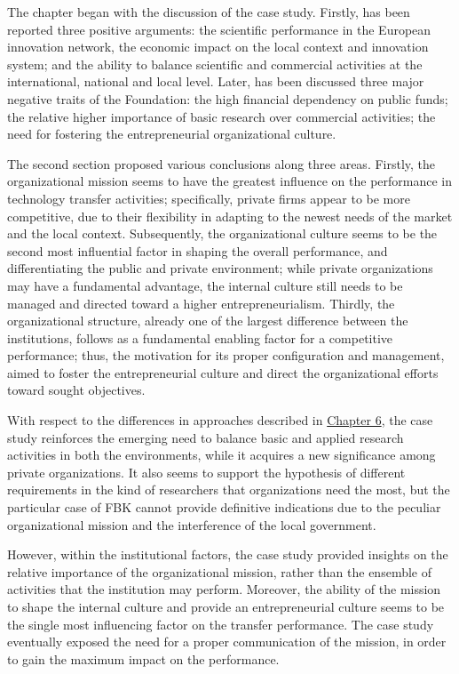 The chapter began with the discussion of the case study. Firstly, has been reported three positive arguments: the scientific performance in the European innovation network, the economic impact on the local context and innovation system; and the ability to balance scientific and commercial activities at the international, national and local level. Later, has been discussed three major negative traits of the Foundation: the high financial dependency on public funds; the relative higher importance of basic research over commercial activities; the need for fostering the entrepreneurial organizational culture. 

The second section proposed various conclusions along three areas. Firstly, the organizational mission seems to have the greatest influence on the performance in technology transfer activities; specifically, private firms appear to be more competitive, due to their flexibility in adapting to the newest needs of the market and the local context. Subsequently, the organizational culture seems to be the second most influential factor in shaping the overall performance, and differentiating the public and private environment; while private organizations may have a fundamental advantage, the internal culture still needs to be managed and directed toward a higher entrepreneurialism. Thirdly, the organizational structure, already one of the largest difference between the institutions, follows as a fundamental enabling factor for a competitive performance; thus, the motivation for its proper configuration and management, aimed to foster the entrepreneurial culture and direct the organizational efforts toward sought objectives.

With respect to the differences in approaches described in \hyperref[Chapter6]{Chapter 6}, the case study reinforces the emerging need to balance basic and applied research activities in both the environments, while it acquires a new significance among private organizations. It also seems to support the hypothesis of different requirements in the kind of researchers that organizations need the most, but the particular case of FBK cannot provide definitive indications due to the peculiar organizational mission and the interference of the local government.

However, within the institutional factors, the case study provided insights on the relative importance of the organizational mission, rather than the ensemble of activities that the institution may perform. Moreover, the ability of the mission to shape the internal culture and provide an entrepreneurial culture seems to be the single most influencing factor on the transfer performance. The case study eventually exposed the need for a proper communication of the mission, in order to gain the maximum impact on the performance. 


